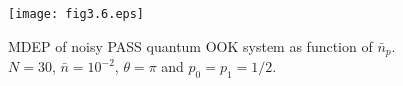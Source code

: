         \begin{figure}[t]
            \begin{center}
                \texttt{[image: fig3.6.eps]}
                \caption{MDEP of noisy PASS quantum OOK system as function of $\bar{n}_p$.\\
                $N=30$, $\bar{n}=10^{-2}$, $\theta=\pi$ and $p_0=p_1=1/2$.}
                \label{fig:3.6}
            \end{center}
        \end{figure}